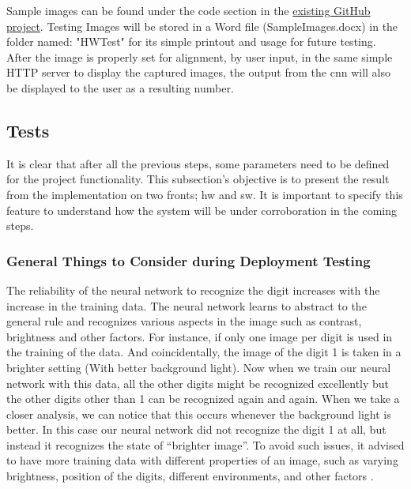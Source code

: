 Sample images can be found under the code section in the \href{https://github.com/jomjol/ctmake-KI-ESP32-Teil2}{existing GitHub project}. Testing Images will be stored in a Word file (SampleImages.docx) in the folder named: "HWTest" for its simple printout and usage for future testing. After the image is properly set for alignment, by user input, in the same simple HTTP server to display the captured images, the output from the \ac{cnn} will also be displayed to the user as a resulting number.

\subsection{Tests}
It is clear that after all the previous steps, some parameters need to be defined for the project functionality. This subsection's objective is to present the result from the implementation on two fronts; \ac{hw} and \ac{sw}. It is important to specify this feature to understand how the system will be under corroboration in the coming steps.


\subsubsection{General Things to Consider during Deployment Testing}

The reliability of the neural network to recognize the digit increases with the increase in the training data. The neural network learns to abstract to the general rule and recognizes various aspects in the image such as contrast, brightness and other factors. For instance, if only one image per digit is used in the training of the data. And coincidentally, the image of the digit 1 is taken in a brighter setting (With better background light). Now when we train our neural network with this data, all the other digits might be recognized excellently but the other digits other than 1 can be recognized again and again. When we take a closer analysis, we can notice that this occurs whenever the background light is better. In this case our neural network did not recognize the digit 1 at all, but instead it recognizes the state of “brighter image”. To avoid such issues, it advised to have more training data with different properties of an image, such as varying brightness, position of the digits, different environments, and other factors \autocite{MakeMedia2021-Part2} .\\

